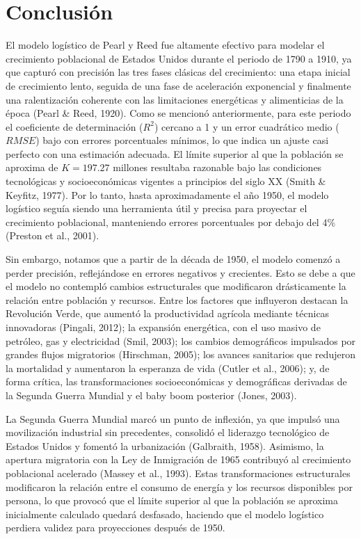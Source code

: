 \documentclass[12pt]{article}
\begin{document}
\newpage
\section{Conclusión}

El modelo logístico de Pearl y Reed fue altamente efectivo para modelar el crecimiento poblacional de Estados Unidos durante el periodo de 1790 a 1910, ya que capturó con precisión las tres fases clásicas del crecimiento: una etapa inicial de crecimiento lento, seguida de una fase de aceleración exponencial y finalmente una ralentización coherente con las limitaciones energéticas y alimenticias de la época (Pearl \& Reed, 1920). Como se mencionó anteriormente, para este periodo el coeficiente de determinación ($R^2$) cercano a 1 y un error cuadrático medio ($RMSE$) bajo con errores porcentuales mínimos, lo que indica un ajuste casi perfecto con una estimación adecuada. El límite superior al que la población se aproxima de $K = 197.27$ millones resultaba razonable bajo las condiciones tecnológicas y socioeconómicas vigentes a principios del siglo XX (Smith \& Keyfitz, 1977). Por lo tanto, hasta aproximadamente el año 1950, el modelo logístico seguía siendo una herramienta útil y precisa para proyectar el crecimiento poblacional, manteniendo errores porcentuales por debajo del 4\% (Preston et al., 2001).

Sin embargo, notamos que a partir de la década de 1950, el modelo comenzó a perder precisión, reflejándose en errores negativos y crecientes. Esto se debe a que el modelo no contempló cambios estructurales que modificaron drásticamente la relación entre población y recursos. Entre los factores que influyeron destacan la Revolución Verde, que aumentó la productividad agrícola mediante técnicas innovadoras (Pingali, 2012); la expansión energética, con el uso masivo de petróleo, gas y electricidad (Smil, 2003); los cambios demográficos impulsados por grandes flujos migratorios (Hirschman, 2005); los avances sanitarios que redujeron la mortalidad y aumentaron la esperanza de vida (Cutler et al., 2006); y, de forma crítica, las transformaciones socioeconómicas y demográficas derivadas de la Segunda Guerra Mundial y el baby boom posterior (Jones, 2003).

La Segunda Guerra Mundial marcó un punto de inflexión, ya que impulsó una movilización industrial sin precedentes, consolidó el liderazgo tecnológico de Estados Unidos y fomentó la urbanización (Galbraith, 1958). Asimismo, la apertura migratoria con la Ley de Inmigración de 1965 contribuyó al crecimiento poblacional acelerado (Massey et al., 1993). Estas transformaciones estructurales modificaron la relación entre el consumo de energía y los recursos disponibles por persona, lo que provocó que el límite superior al que la población se aproxima inicialmente calculado quedará desfasado, haciendo que el modelo logístico perdiera validez para proyecciones después de 1950.
\end{document}

